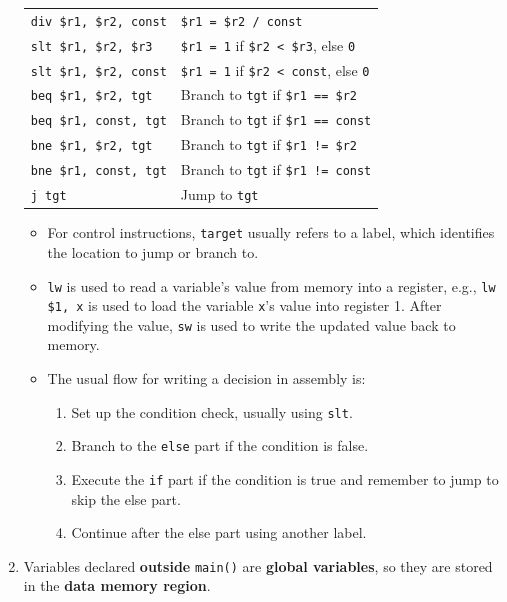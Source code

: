 \documentclass[10pt, landscape]{article}
\begin{document}
\begin{multicols}{4}
\begin{enumerate}
{\begin{tabular}{l p{}}
    \texttt{div \$r1, \$r2, const} & \texttt{\$r1 = \$r2 / const} \\
    \texttt{slt \$r1, \$r2, \$r3} & \texttt{\$r1 = 1} if \texttt{\$r2 < \$r3}, else \texttt{0} \\
    \texttt{slt \$r1, \$r2, const} & \texttt{\$r1 = 1} if \texttt{\$r2 < const}, else \texttt{0} \\
    \hline
    \texttt{beq \$r1, \$r2, tgt} & Branch to \texttt{tgt} if \texttt{\$r1 == \$r2} \\
    \texttt{beq \$r1, const, tgt} & Branch to \texttt{tgt} if \texttt{\$r1 == const} \\
    \texttt{bne \$r1, \$r2, tgt} & Branch to \texttt{tgt} if \texttt{\$r1 != \$r2} \\
    \texttt{bne \$r1, const, tgt} & Branch to \texttt{tgt} if \texttt{\$r1 != const} \\
    \texttt{j tgt} & Jump to \texttt{tgt} \\
    \hline
    \end{tabular}\par}
    \begin{itemize}
        \item For control instructions, \texttt{target} usually refers to a label, which identifies the location to jump or branch to.
        \item \texttt{lw} is used to read a variable's value from memory into a register, e.g., \texttt{lw \$1, x} is used to load the variable \texttt{x}'s value into register 1. After modifying the value, \texttt{sw} is used to write the updated value back to memory.
        \item The usual flow for writing a decision in assembly is:
        \begin{enumerate}
            \item Set up the condition check, usually using \texttt{slt}.
            \item Branch to the \texttt{else} part if the condition is false.
            \item Execute the \texttt{if} part if the condition is true and remember to jump to skip the else part.
            \item Continue after the else part using another label.
        \end{enumerate}
    \end{itemize}
    \item Variables declared \textbf{outside} \texttt{main()} are \textbf{global variables}, so they are stored in the \textbf{data memory region}.

\end{enumerate}
\end{multicols}
\end{document}
